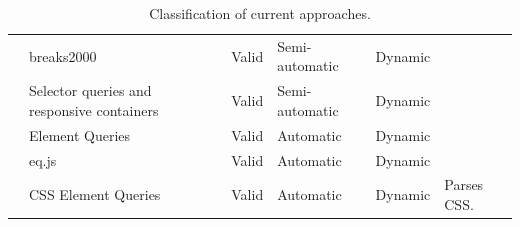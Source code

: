 \documentclass[a4paper,11pt]{kth-mag}
\begin{document}
\begin{table}[ht]
\begin{tabular}[t]{ l p{3cm} l l l p{3cm} }
        \cite{eq_imp_breaks2000} &            breaks2000 &                                  Valid &     Semi-automatic &  Dynamic &   \\
        \cite{eq_imp_selector_queries} &      Selector queries and responsive containers &  Valid &     Semi-automatic &  Dynamic &   \\
        \cite{eq_imp_element-queries} &       Element Queries &                             Valid &     Automatic &       Dynamic &   \\
        \cite{eq_imp_eqjs} &                  eq.js &                                       Valid &     Automatic &       Dynamic &   \\
        \cite{eq_imp_css-element-queries} &   CSS Element Queries &                         Valid &     Automatic &       Dynamic &   Parses CSS. \\
      \end{tabular}
      \caption{Classification of current approaches.}
      \label{table:approaches-classifications}
    \end{table}
    
\end{document}
